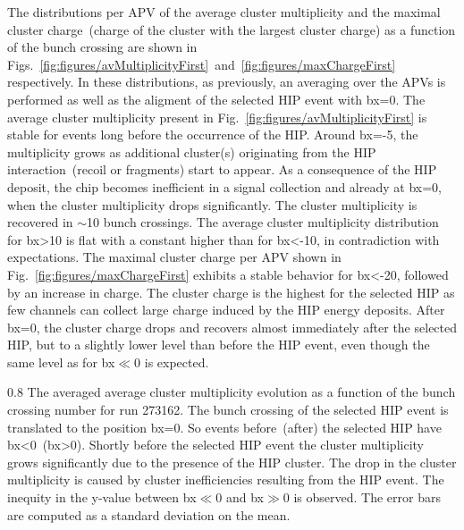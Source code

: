 The distributions per APV of the average cluster multiplicity and the maximal cluster charge~(charge of the cluster with the largest cluster charge) as a function of the bunch crossing are shown in Figs.~\ref{fig:figures/avMultiplicityFirst}~and~\ref{fig:figures/maxChargeFirst} respectively. In these distributions, as previously, an averaging over the APVs is performed as well as the aligment of the selected HIP event with bx=0. The average cluster multiplicity present in Fig.~\ref{fig:figures/avMultiplicityFirst} is stable for events long before the occurrence of the HIP. Around bx=-5, the multiplicity grows as additional cluster(s) originating from the HIP interaction~(recoil or fragments) start to appear. As a consequence of the HIP deposit, the chip becomes inefficient in a signal collection and already at bx=0, when  the cluster multiplicity drops significantly. The cluster multiplicity is recovered in $\sim$10 bunch crossings. The average cluster multiplicity distribution for bx>10 is flat with a constant higher than for bx<-10, in contradiction with expectations. The maximal cluster charge per APV shown in Fig.~\ref{fig:figures/maxChargeFirst} exhibits a stable behavior for bx<-20, followed by an increase in charge. The cluster charge is the highest for the selected HIP as few channels can collect large charge induced by the HIP energy deposits. After bx=0, the cluster charge drops and recovers almost immediately after the selected HIP, but to a slightly lower level than before the HIP event, even though the same level as for bx$\ll$0 is expected. 



                 {0.8}       %
                 {The averaged average cluster multiplicity evolution as a function of the bunch crossing number for run 273162. The bunch crossing of the selected HIP event is translated to the position bx=0. So events before~(after) the selected HIP have bx<0~(bx>0). Shortly before the selected HIP event the cluster multiplicity grows significantly due to the presence of the HIP cluster. The drop in the cluster multiplicity is caused by cluster inefficiencies resulting from the HIP event. The inequity in the y-value between bx$\ll$0 and bx$\gg$0 is observed. The error bars are computed as a standard deviation on the mean. } %

